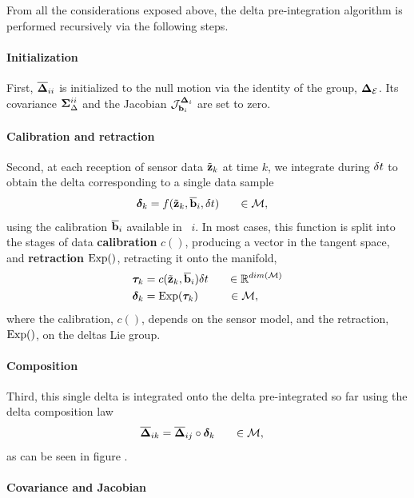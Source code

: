 From all the considerations exposed above, the delta pre-integration algorithm is performed recursively via the following steps.

\paragraph{Initialization}
First, $\overline{{{\bm \Delta}}}_{ii}$ is initialized to the null motion via the identity of the group, ${{\bm \Delta}}_{\mathcal{E}}$. 
Its covariance ${\bm \Sigma}_\Delta^{ii}$ and the Jacobian ${\mathcal{J}^{{{\bm \Delta}}_i}_{{\bf b}_i}}$ are set to zero. 

\paragraph{Calibration and retraction}
Second, at each reception of sensor data $\tilde{{\bf z}}_k$ at time $k$, we integrate during $\delta t$ to obtain the delta corresponding to a single data sample
%
\begin{align}
    \bm\delta_k &= f(\tilde{{\bf z}}_k, \overline{{\bf b}}_i, \delta t)  ~~~~~\in \mathcal{M}, 
    \label{eq:data2delta}
\end{align}
%
using the calibration $\overline{{\bf b}}_i$ available in \keyframe\ $i$. 
In most cases, this function is split into the stages of data \textbf{calibration} $c()$, producing a vector in the tangent space, and \textbf{retraction} $\operatorname*{Exp}()$, retracting 
it onto the manifold,
%
\begin{align}
    {\bm \tau}_k &= c(\tilde{{\bf z}}_k, \overline{{\bf b}}_i) \delta t ~~~~~\in \mathbb{R}^{dim(\mathcal{M})}\\
    \bm\delta_k &= \operatorname*{Exp}({\bm \tau}_k) ~~~~~~~~\in \mathcal{M},
\end{align}
%
where the calibration, $c()$, depends on the sensor model, and the retraction, $\operatorname*{Exp}()$, on the deltas Lie group.

\paragraph{Composition}
Third, this single delta is integrated onto the delta pre-integrated so far using the delta composition law
%
\begin{align}
    \overline{{{\bm \Delta}}}_{ik} &= \overline{{{\bm \Delta}}}_{ij} \circ \bm\delta_k ~~~~~\in \mathcal{M},
    \label{eq:deltaPlusDelta}
\end{align}
%
as can be seen in figure .


\paragraph{Covariance and Jacobian}

